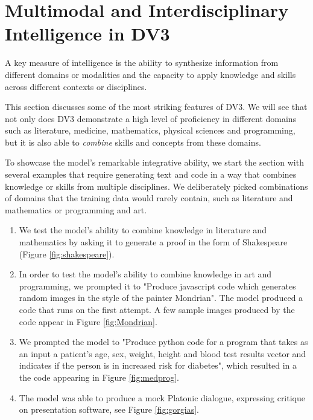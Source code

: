 \newcommand{\lightg}[1]{\colorbox{lime}{\parbox{\linewidth}{#1}}}
\section{Multimodal and Interdisciplinary Intelligence in DV3}
A key measure of intelligence is the ability to synthesize information from different domains or modalities and the capacity to apply knowledge and skills across different contexts or disciplines.

This section discusses some of the most striking features of DV3. We will see that not only does DV3 demonstrate a high level of proficiency in different domains such as literature, medicine, mathematics, physical sciences and programming, but it is also able to \emph{combine} skills and concepts from these domains. 

To showcase the model's remarkable integrative ability, we start the section with several examples that require generating text and code in a way that combines knowledge or skills from multiple disciplines. We deliberately picked combinations of domains that the training data would rarely contain, such as literature and mathematics or programming and art.

\begin{enumerate}[]
\item 
We test the model's ability to combine knowledge in literature and mathematics by asking it to generate a proof in the form of Shakespeare (Figure \ref{fig:shakespeare}).
\item
In order to test the model's ability to combine knowledge in art and programming, we prompted it to "Produce javascript code which generates random images in the style of the painter Mondrian". The model produced a code that runs on the first attempt. A few sample images produced by the code appear in Figure \ref{fig:Mondrian}.
\item 
We prompted the model to "Produce python code for a program that takes as an input a patient's age, sex, weight, height and blood test results vector and indicates if the person is in increased risk for diabetes", which resulted in a the code appearing in Figure \ref{fig:medprog}.
\item 
The model was able to produce a mock Platonic dialogue, expressing critique on presentation software, see Figure \ref{fig:gorgias}.
\end{enumerate}

